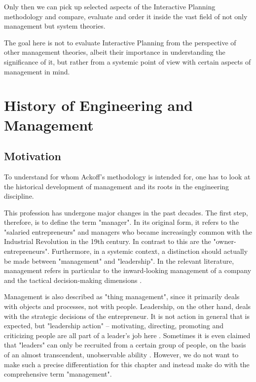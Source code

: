 \documentclass[a4paper,12pt]{article}
\begin{document}
Only then we can pick up selected aspects of the Interactive Planning
methodology and compare, evaluate and order it inside the vast field of not
only management but system theories.

The goal here is not to evaluate Interactive Planning from the perspective of
other management theories, albeit their importance in understanding the
significance of it, but rather from a systemic point of view with certain
aspects of management in mind.  

\section{History of Engineering and Management}

\subsection{Motivation}
To understand for whom Ackoff's methodology is intended for, one has to look
at the historical development of management and its roots in the engineering
discipline.

This profession has undergone major changes in the past decades. The first
step, therefore, is to define the term "manager". In its original form, it
refers to the "salaried entrepreneurs" and managers who became increasingly
common with the Industrial Revolution in the 19th century. In contrast to this
are the "owner-entrepreneurs". Furthermore, in a systemic context, a
distinction should actually be made between "management" and "leadership". In
the relevant literature, management refers in particular to the inward-looking
management of a company and the tactical decision-making dimensions
\cite{kocka:1999}.

Management is also described as "thing management", since it primarily deals
with objects and processes, not with people. Leadership, on the other hand,
deals with the strategic decisions of the entrepreneur. It is not action in
general that is expected, but "leadership action" -- motivating, directing,
promoting and criticizing people are all part of a leader's job here
\cite{niermann:2017}.  Sometimes it is even claimed that "leaders" can only be
recruited from a certain group of people, on the basis of an almost
transcendent, unobservable ability \cite{boehmer:2014}.  However, we do not
want to make such a precise differentiation for this chapter and instead make
do with the comprehensive term "management".
\end{document}
